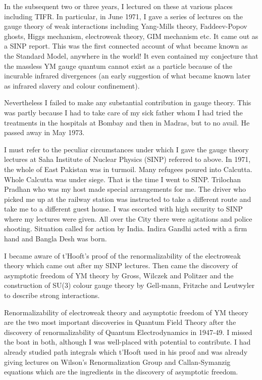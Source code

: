 In the subsequent two or three years, I lectured on these at various 
places including TIFR. In particular, in June 1971, I gave a series of 
lectures on the gauge theory of weak interactions including Yang-Mills 
theory, Faddeev-Popov ghosts, Higgs mechanism, electroweak theory, GIM 
mechanism etc. It came out as a SINP report. This was the first 
connected account of what became known as the Standard Model, anywhere 
in the world! It even contained my conjecture that the massless YM gauge 
quantum cannot exist as a particle because of the incurable infrared 
divergences (an early suggestion of what became known later as infrared 
slavery and colour confinement).

Nevertheless I failed to make any substantial contribution in gauge 
theory. This was partly because I had to take care of my sick father 
whom I had tried the treatments in the hospitals at Bombay and then in 
Madras, but to no avail. He passed away in May 1973.

I must refer to the peculiar circumstances under which I gave the gauge 
theory lectures at Saha Institute of Nuclear Physics (SINP) referred 
to above. In 1971, the whole of East Pakistan was in turmoil. Many 
refugees poured into Calcutta. Whole Calcutta was under siege. That is 
the time I went to SINP. Trilochan Pradhan who was my host made special 
arrangements for me. The driver who picked me up at the railway station 
was instructed to take a different route and take me to a different 
guest house. I was escorted with high security to SINP where my lectures 
were given. All over the City there were agitations and police shooting. 
Situation called for action by India. Indira Gandhi acted with a firm 
hand and Bangla Desh was born.
  
I became aware of t'Hooft's proof of the renormalizability of the 
electroweak theory which came out after my SINP lectures. Then came the 
discovery of asymptotic freedom of YM theory by Gross, Wilczek and 
Politzer and the construction of SU(3) colour gauge theory by Gell-mann, 
Fritzche and Leutwyler to describe strong interactions.

Renormalizability of electroweak theory and asymptotic freedom of YM 
theory are the two most important discoveries in Quantum Field Theory 
after the discovery of renormalizability of Quantum Electrodynamics in 
1947-49. I missed the boat in both, although I was well-placed with 
potential to contribute. I had already studied path integrals which 
t'Hooft used in his proof and was already giving lectures on Wilson's 
Renormalization Group and Callan-Symanzig equations which are the 
ingredients in the discovery of asymptotic freedom.

